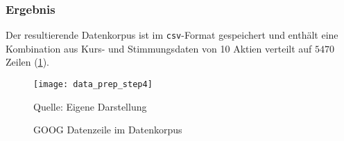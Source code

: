 \subsubsection*{Ergebnis}
Der resultierende Datenkorpus ist im \texttt{csv}-Format gespeichert und enthält eine Kombination aus Kurs- und Stimmungsdaten von 10 Aktien verteilt auf $5470$ Zeilen (\ref{fig:data_prep_step4}).
\begin{figure}[H]
	\caption{GOOG Datenzeile im Datenkorpus}
	\texttt{[image: data\_prep\_step4]}
	\label{fig:data_prep_step4}
	\raggedright
	\normalsize{Quelle: Eigene Darstellung}
	\vspace{-1.0em}
\end{figure}




